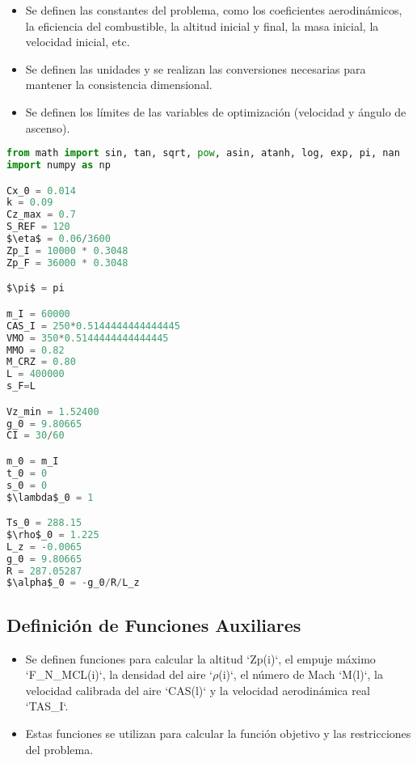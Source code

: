 \documentclass[fleqn]{article}
\begin{document}
\begin{itemize}
    \item Se definen las constantes del problema, como los coeficientes aerodinámicos, la eficiencia del combustible, la altitud inicial y final, la masa inicial, la velocidad inicial, etc.
    \item Se definen las unidades y se realizan las conversiones necesarias para mantener la consistencia dimensional.
    \item Se definen los límites de las variables de optimización (velocidad y ángulo de ascenso).
\end{itemize}

\begin{lstlisting}[language=Python, firstnumber=1, style = mystyle, mathescape=true]
from math import sin, tan, sqrt, pow, asin, atanh, log, exp, pi, nan
import numpy as np

Cx_0 = 0.014 
k = 0.09 
Cz_max = 0.7 
S_REF = 120 
$\eta$ = 0.06/3600  
Zp_I = 10000 * 0.3048  
Zp_F = 36000 * 0.3048  

$\pi$ = pi

m_I = 60000  
CAS_I = 250*0.5144444444444445  
VMO = 350*0.5144444444444445  
MMO = 0.82 
M_CRZ = 0.80 
L = 400000  
s_F=L

Vz_min = 1.52400  
g_0 = 9.80665  
CI = 30/60  

m_0 = m_I  
t_0 = 0  
s_0 = 0  
$\lambda$_0 = 1  

Ts_0 = 288.15  
$\rho$_0 = 1.225  
L_z = -0.0065  
g_0 = 9.80665  
R = 287.05287  
$\alpha$_0 = -g_0/R/L_z  
\end{lstlisting}


\subsection{Definición de Funciones Auxiliares}

\begin{itemize}
    \item Se definen funciones para calcular la altitud `Zp(i)`, el empuje máximo `F\_N\_MCL(i)`, la densidad del aire `$\rho$(i)`, el número de Mach `M(l)`, la velocidad calibrada del aire `CAS(l)` y la velocidad aerodinámica real `TAS\_I`.
    \item Estas funciones se utilizan para calcular la función objetivo y las restricciones del problema.
\end{itemize}
\end{document}
